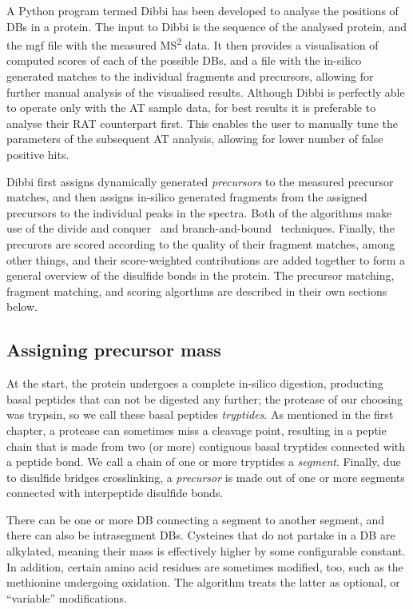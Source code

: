 A Python program termed Dibbi has been developed to analyse the positions of DBs in a protein. The input to Dibbi is the sequence of the analysed protein, and the mgf file with the measured MS\textsuperscript{2} data. It then provides a visualisation of computed scores of each of the possible DBs, and a file with the in-silico generated matches to the individual fragments and precursors, allowing for further manual analysis of the visualised results. Although Dibbi is perfectly able to operate only with the AT sample data, for best results it is preferable to analyse their RAT counterpart first. This enables the user to manually tune the parameters of the subsequent AT analysis, allowing for lower number of false positive hits.

Dibbi first assigns dynamically generated \emph{precursors} to the measured precursor matches, and then assigns in-silico generated fragments from the assigned precursors to the individual peaks in the spectra. Both of the algorithms make use of the divide and conquer~\cite{smith1985design} and branch-and-bound~\cite{boyd2007branch} techniques. Finally, the precurors are scored according to the quality of their fragment matches, among other things, and their score-weighted contributions are added together to form a general overview of the disulfide bonds in the protein. The precursor matching, fragment matching, and scoring algorthms are described in their own sections below.

\subsection{Assigning precursor mass}

At the start, the protein undergoes a complete in-silico digestion, producting basal peptides that can not be digested any further; the protease of our choosing was trypsin, so we call these basal peptides \emph{tryptides}. As mentioned in the first chapter, a protease can sometimes miss a cleavage point, resulting in a peptie chain that is made from two (or more) contiguous basal tryptides connected with a peptide bond. We call a chain of one or more tryptides a \emph{segment}. Finally, due to disulfide bridges crosslinking, a \emph{precursor} is made out of one or more segments connected with interpeptide disulfide bonds.

There can be one or more DB connecting a segment to another segment, and there can also be intrasegment DBs. Cysteines that do not partake in a DB are alkylated, meaning their mass is effectively higher by some configurable constant. In addition, certain amino acid residues are sometimes modified, too, such as the methionine undergoing oxidation. The algorithm treats the latter as optional, or ``variable'' modifications.

